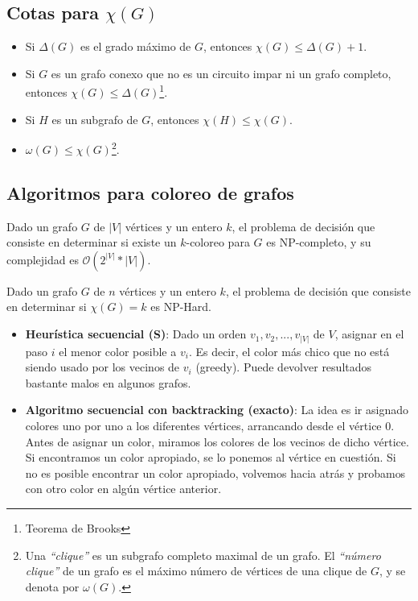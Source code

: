 \subsection{Cotas para $\chi(G)$}
\begin{itemize}
\item Si $\Delta(G)$ es el grado m\'aximo de $G$, entonces $\chi(G) \leq \Delta(G) + 1$.
\item Si $G$ es un grafo conexo que no es un circuito impar ni un grafo completo, entonces $\chi(G) \leq \Delta(G)$\footnote{Teorema de Brooks}.
\item Si $H$ es un subgrafo de $G$, entonces $\chi(H) \leq \chi(G)$.
\item $\omega(G) \leq \chi(G)$\footnote{Una \emph{``clique''} es un subgrafo completo maximal de un grafo. El \emph{``n\'umero clique''} de un grafo es el m\'aximo n\'umero de v\'ertices de una clique de $G$, y se denota por $\omega(G)$.}.
\end{itemize}



\newpage
\subsection{Algoritmos para coloreo de grafos}

Dado un grafo $G$ de $|V|$ v\'ertices y un entero $k$, el problema de decisi\'on que consiste en determinar si existe un $k$-coloreo para $G$ es NP-completo, y su complejidad es  $\mathcal{O}(2^{|V|} * |V|)$.

Dado un grafo $G$ de $n$ v\'ertices y un entero $k$, el problema de decisi\'on que consiste en determinar si $\chi(G) = k$ es NP-Hard.

\begin{itemize}
\item \textbf{Heur\'istica secuencial (S)}: Dado un orden $v_1, v_2, ..., v_{|V|}$ de $V$, asignar en el paso $i$ el menor color posible a $v_i$. Es decir, el color m\'as chico que no est\'a siendo usado por los vecinos de $v_i$ (greedy). Puede devolver resultados bastante malos en algunos grafos.
\item \textbf{Algoritmo secuencial con backtracking (exacto)}: La idea es ir asignado colores uno por uno a los diferentes v\'ertices, arrancando desde el v\'ertice 0. Antes de asignar un color, miramos los colores de los vecinos de dicho v\'ertice. Si encontramos un color apropiado, se lo ponemos al v\'ertice en cuesti\'on. Si no es posible encontrar un color apropiado, volvemos hacia atr\'as y probamos con otro color en alg\'un v\'ertice anterior.
\end{itemize}

